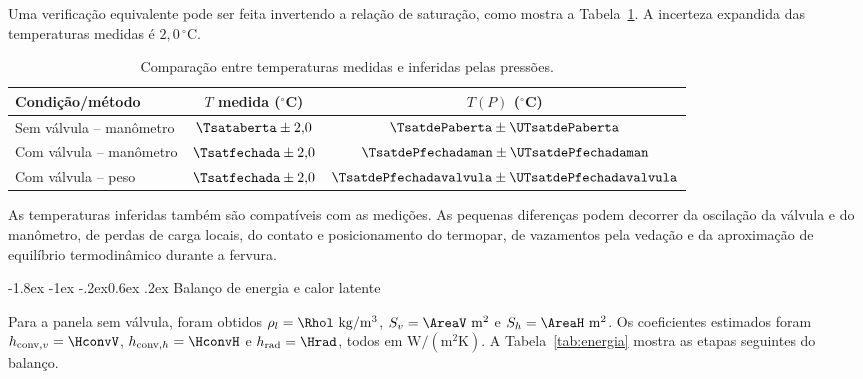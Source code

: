 \documentclass[11pt,a4paper]{article}
\makeatletter
\renewcommand\subsection{\@startsection{subsection}{2}{\z@}%
  {-1.8ex \@plus -1ex \@minus -.2ex}{0.6ex \@plus .2ex}%
  {\normalfont\normalsize\bfseries\color{petrol}}}
\makeatother
\begin{document}
Uma verificação equivalente pode ser feita invertendo a relação de saturação,
como mostra a Tabela~\ref{tab:temperaturas}. A incerteza expandida das
temperaturas medidas é $2{,}0\,^{\circ}\mathrm{C}$.

\begin{table}[H]
\centering
\caption{Comparação entre temperaturas medidas e inferidas pelas pressões.}
\label{tab:temperaturas}
\small
\begin{tabular}{lcc}
\toprule
\textbf{Condição/método} & \textbf{$T$ medida ($^{\circ}$C)} &
\textbf{$T(P)$ ($^{\circ}$C)}\\
\midrule
Sem válvula -- manômetro & $\Tsataberta\pm2{,}0$ &
$\TsatdePaberta\pm\UTsatdePaberta$\\
Com válvula -- manômetro & $\Tsatfechada\pm2{,}0$ &
$\TsatdePfechadaman\pm\UTsatdePfechadaman$\\
Com válvula -- peso & $\Tsatfechada\pm2{,}0$ &
$\TsatdePfechadavalvula\pm\UTsatdePfechadavalvula$\\
\bottomrule
\end{tabular}
\end{table}

As temperaturas inferidas também são compatíveis com as medições. As pequenas
diferenças podem decorrer da oscilação da válvula e do manômetro, de perdas de
carga locais, do contato e posicionamento do termopar, de vazamentos pela
vedação e da aproximação de equilíbrio termodinâmico durante a fervura.

\subsection{Balanço de energia e calor latente}

Para a panela sem válvula, foram obtidos $\rho_l=\Rhol\ \mathrm{kg/m^3}$,
$S_v=\AreaV\ \mathrm{m^2}$ e $S_h=\AreaH\ \mathrm{m^2}$. Os coeficientes
estimados foram $h_{\mathrm{conv},v}=\HconvV$,
$h_{\mathrm{conv},h}=\HconvH$ e $h_{\mathrm{rad}}=\Hrad$, todos em
$\mathrm{W/(m^2K)}$. A Tabela~\ref{tab:energia} mostra as etapas seguintes do
balanço.
\end{document}
